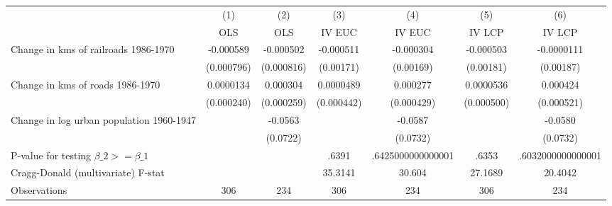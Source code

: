 {
\def\sym#1{\ifmmode^{#1}\else\(^{#1}\)\fi}
\begin{tabular}{l*{6}{c}}
\hline\hline
                &\multicolumn{1}{c}{(1)}&\multicolumn{1}{c}{(2)}&\multicolumn{1}{c}{(3)}&\multicolumn{1}{c}{(4)}&\multicolumn{1}{c}{(5)}&\multicolumn{1}{c}{(6)}\\
                &\multicolumn{1}{c}{OLS}&\multicolumn{1}{c}{OLS}&\multicolumn{1}{c}{IV EUC}&\multicolumn{1}{c}{IV EUC}&\multicolumn{1}{c}{IV LCP}&\multicolumn{1}{c}{IV LCP}\\
\hline
Change in kms of railroads 1986-1970&-0.000589         &-0.000502         &-0.000511         &-0.000304         &-0.000503         &-0.0000111         \\
                &(0.000796)         &(0.000816)         &(0.00171)         &(0.00169)         &(0.00181)         &(0.00187)         \\
[1em]
Change in kms of roads 1986-1970&0.0000134         & 0.000304         &0.0000489         & 0.000277         &0.0000536         & 0.000424         \\
                &(0.000240)         &(0.000259)         &(0.000442)         &(0.000429)         &(0.000500)         &(0.000521)         \\
[1em]
Change in log urban population 1960-1947&                  &  -0.0563         &                  &  -0.0587         &                  &  -0.0580         \\
                &                  & (0.0722)         &                  & (0.0732)         &                  & (0.0732)         \\
\hline
P-value for testing $\beta\_{2} >= \beta\_{1}$&                  &                  &    .6391         &.6425000000000001         &    .6353         &.6032000000000001         \\
Cragg-Donald (multivariate) F-stat&                  &                  &  35.3141         &   30.604         &  27.1689         &  20.4042         \\
Observations    &      306         &      234         &      306         &      234         &      306         &      234         \\
\hline\hline
\end{tabular}
}
